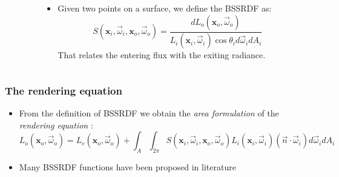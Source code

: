 \documentclass{beamer}
\newcommand{\vomega}{\vec{\omega}}
\newcommand{\x}{\mathbf{x}}
\begin{document}
\begin{frame}
\begin{columns}
\begin{column}{0.4\textwidth}
				\end{column}
    \begin{column}{0.6\textwidth}
		\begin{itemize}
				\item Given two points on a surface, we define the BSSRDF as:
$$
S(\x_i, \vomega_i, \x_o, \vomega_o) = \frac{d L_o(\x_o,\vomega_o)}{L_i(\x_i,\vomega_i) \cos \theta_i d\vomega_i d A_i}  
$$			
				That relates the entering flux with the exiting radiance.
		\end{itemize}
    \end{column}
​  \end{columns}
\end{frame}

\begin{frame}
    \frametitle{The rendering equation}
			\begin{itemize}
				\item From the definition of BSSRDF we obtain the \emph{area formulation} of the \emph{rendering equation} \citep{Jensen:2001:PMS:383259.383319}:
				$$L_o(\x_o,\vomega_o) = L_e(\x_o,\vomega_o) + \int_A \int_{2\pi} S(\x_i, \vomega_i, \x_o, \vomega_o) L_i(\x_i,\vomega_i) (\vec{n} \cdot \vomega_i) d\vomega_i d A_i$$
				\item Many BSSRDF functions have been proposed in literature \citep{Jensen:2001:PMS:383259.383319,D'Eon:2011:QMR:1964921.1964951,IMM2013-06646}  
			\end{itemize}

\end{frame}
\end{document}
